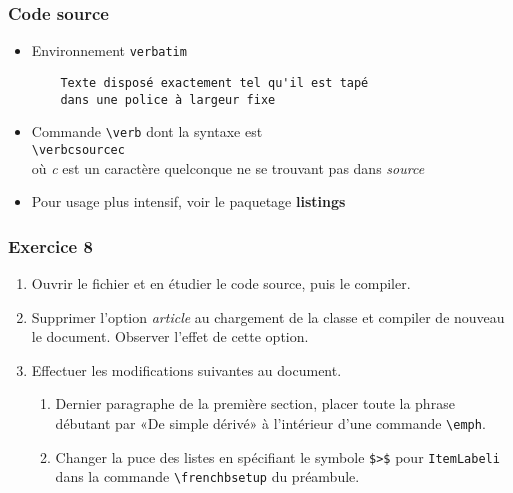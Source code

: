 
\begin{frame}[fragile]

	\frametitle{Code source}
	
	\begin{itemize}
		\item Environnement \texttt{verbatim}
		\begin{codesource}
	\begin{verbatim}
	Texte disposé exactement tel qu'il est tapé
	dans une police à largeur fixe
	\end{verbatim}
		\end{codesource}
	
		\item Commande \texttt{\textbackslash verb} dont la syntaxe est \\
			\lstinline|\verbcsourcec| \\
			où \textit{c} est un caractère quelconque ne se trouvant pas dans \textit{source}
			
		\item Pour usage plus intensif, voir le paquetage \textbf{listings}
	\end{itemize}
\end{frame}


\begin{frame}[fragile]

	\frametitle{Exercice 8}
	
	\begin{enumerate}
		\item Ouvrir le fichier et en étudier le code source, puis le compiler.			
		\item Supprimer l’option \textit{article} au chargement de la classe et
			compiler de nouveau le document. Observer l’effet de cette option.			
		\item Effectuer les modifications suivantes au document.		
			\begin{enumerate}
				\item Dernier paragraphe de la première section, placer toute la phrase
					débutant par «De simple dérivé» à l’intérieur d’une commande
					\lstinline|\emph|.
				\item Changer la puce des listes en spécifiant le symbole \lstinline|$>$| pour
					\texttt{ItemLabeli} dans la commande \lstinline|\frenchbsetup| du préambule.
			\end{enumerate}
	\end{enumerate}
\end{frame}
